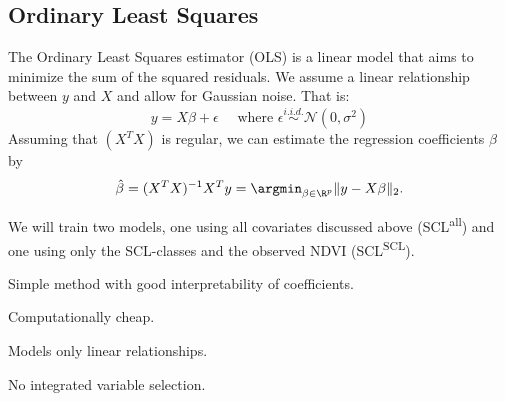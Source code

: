 
\subsection{Ordinary Least Squares}{\label{sec:corr_model_OLS}
    The Ordinary Least Squares estimator (OLS) is a linear model that aims to minimize the sum of the squared residuals. We assume a linear relationship between $y$ and $X$ and allow for Gaussian noise. That is:
    \begin{equation}
        \label{eq:ols}
        y = X\beta  + \epsilon \quad \text{ where }\epsilon \overset{i.i.d.}{\sim}\mathcal{N}(0,\sigma^2)
    \end{equation}
    Assuming that $(X^TX)$ is regular, we can estimate the regression coefficients $\beta$ by
    \begin{equation}
        \hat \beta = (X^TX)^{-1}X^Ty = \argmin_{\beta \in \R^p}\|y - X\beta\|_2 .
    \end{equation}

    We will train two models, one using all covariates discussed above (SCL\textsuperscript{all}) and one using only the SCL-classes and the observed NDVI (SCL\textsuperscript{SCL}). 

    \begin{my_pros_cons_table}{
        \item Simple method with good interpretability of coefficients.
        \item Computationally cheap.
    }{
        \item Models only linear relationships.
        \item No integrated variable selection.\footnotemark
    }
    \end{my_pros_cons_table}
}
